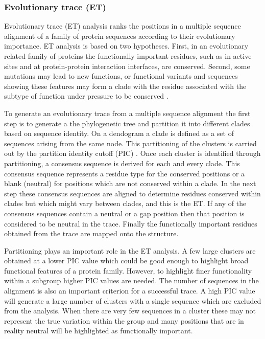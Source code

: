 			\subsubsection{Evolutionary trace (ET)}
			\label{sec:ET}
			Evolutionary trace (ET)  analysis ranks the positions in a multiple sequence alignment of a family of protein sequences according to their evolutionary importance. ET analysis is based on two hypotheses. First, in an evolutionary related family of proteins the functionally important residues, such as in active sites and at protein-protein interaction interfaces, are conserved. Second, some mutations may lead to new functions, or functional variants and sequences showing these features may form a clade with the residue associated with the subtype of function under pressure to be conserved \parencite{Lichtarge1996}. 
		
			To generate an evolutionary trace from a multiple sequence alignment the first step is to generate a the phylogenetic tree and partition it into different clades based on sequence identity. On a dendogram a clade is defined as a set of sequences arising from the same node. This partitioning of the clusters is carried out by the partition identity cutoff (PIC) \parencite{Du1994}. Once each cluster is identified through partitioning, a consensus sequence is derived for each and every clade. This consensus sequence represents a residue type for the conserved positions or a blank (neutral) for positions which are not conserved within a clade. In the next step these consensus sequences are aligned to determine residues conserved within clades but which might vary between clades, and this is the ET. If any of the consensus sequences contain a neutral or a gap position then that position is considered to be neutral in the trace. Finally the functionally important residues obtained from the trace are mapped onto the structure.
			
			Partitioning plays an important role in the ET analysis. A few large clusters are obtained at a lower PIC value which could be good enough to highlight broad functional features of a protein family. However, to highlight finer functionality within a subgroup higher PIC values are needed. The number of sequences in the alignment is also an important criterion for a successful trace. A high PIC value will generate a large number of clusters with a single sequence which are excluded from the analysis. When there are very few sequences in a cluster these may not represent the true variation within the group and many positions that are in reality neutral will be highlighted as functionally important.
		
